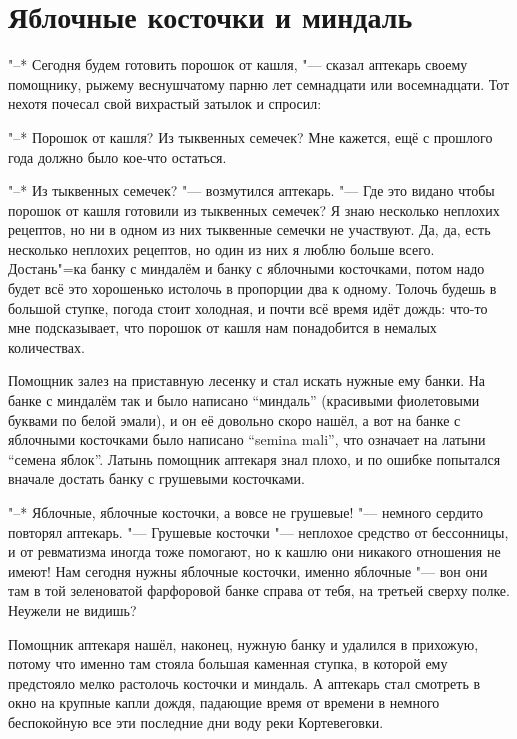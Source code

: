 \section{Яблочные косточки и миндаль}

"--* Сегодня будем готовить порошок от кашля, "--- сказал аптекарь своему
помощнику, рыжему веснушчатому парню лет семнадцати или восемнадцати.
Тот нехотя почесал свой вихрастый затылок и спросил:

"--* Порошок от кашля?
Из тыквенных семечек?
Мне кажется, ещё с прошлого года должно было кое-что остаться.

"--* Из тыквенных семечек? "--- возмутился аптекарь.
"--- Где это видано чтобы порошок от кашля готовили из тыквенных семечек?
Я знаю несколько неплохих рецептов, но ни в одном из них тыквенные семечки не
участвуют.
Да, да, есть несколько неплохих рецептов, но один из них я люблю больше всего.
Достань"=ка банку с миндалём и банку с яблочными косточками, потом надо будет
всё это хорошенько истолочь в пропорции два к одному.
Толочь будешь в большой ступке, погода стоит холодная, и почти всё время идёт
дождь: что-то мне подсказывает, что порошок от кашля нам понадобится в немалых
количествах.

Помощник залез на приставную лесенку и стал искать нужные ему банки.
На банке с миндалём так и было написано \enquote{миндаль} (красивыми фиолетовыми
буквами по белой эмали), и он её довольно скоро нашёл, а вот на банке с
яблочными косточками было написано
\enquote{semina mali},
что означает на латыни \enquote{семена яблок}.
Латынь помощник аптекаря знал плохо, и по ошибке попытался вначале достать банку
с грушевыми косточками.

"--* Яблочные, яблочные косточки, а вовсе не грушевые! "--- немного сердито
повторял аптекарь.
"--- Грушевые косточки "--- неплохое средство от бессонницы, и от ревматизма
иногда тоже помогают, но к кашлю они никакого отношения не имеют!
Нам сегодня нужны яблочные косточки, именно яблочные "--- вон они там в той
зеленоватой фарфоровой банке справа от тебя, на третьей сверху полке.
Неужели не видишь?

Помощник аптекаря нашёл, наконец, нужную банку и удалился в прихожую, потому что
именно там стояла большая каменная ступка, в которой ему предстояло мелко
растолочь косточки и миндаль.
А аптекарь стал смотреть в окно на крупные капли дождя, падающие время от
времени в немного беспокойную все эти последние дни воду реки Кортевеговки.

